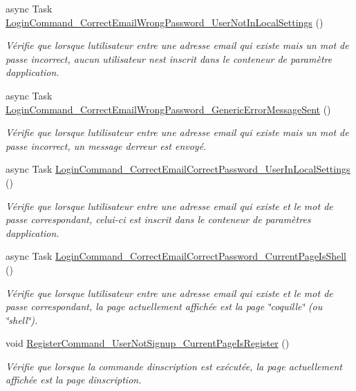 \begin{DoxyCompactItemize}
async Task \hyperlink{class_boxes_1_1_tests_1_1_login_view_model_tests_a2fb23554feb022458a5018736f4ce647}{Login\+Command\+\_\+\+Correct\+Email\+Wrong\+Password\+\_\+\+User\+Not\+In\+Local\+Settings} ()
\begin{DoxyCompactList}\small\item\em Vérifie que lorsque l\textquotesingle{}utilisateur entre une adresse email qui existe mais un mot de passe incorrect, aucun utilisateur n\textquotesingle{}est inscrit dans le conteneur de paramètre d\textquotesingle{}application. \end{DoxyCompactList}\item 
async Task \hyperlink{class_boxes_1_1_tests_1_1_login_view_model_tests_a2a1127de3f6d7a127c1e8988a6b9cd9d}{Login\+Command\+\_\+\+Correct\+Email\+Wrong\+Password\+\_\+\+Generic\+Error\+Message\+Sent} ()
\begin{DoxyCompactList}\small\item\em Vérifie que lorsque l\textquotesingle{}utilisateur entre une adresse email qui existe mais un mot de passe incorrect, un message d\textquotesingle{}erreur est envoyé. \end{DoxyCompactList}\item 
async Task \hyperlink{class_boxes_1_1_tests_1_1_login_view_model_tests_ad0a8d68e805d64ee8a8f35ccd071f9e3}{Login\+Command\+\_\+\+Correct\+Email\+Correct\+Password\+\_\+\+User\+In\+Local\+Settings} ()
\begin{DoxyCompactList}\small\item\em Vérifie que lorsque l\textquotesingle{}utilisateur entre une adresse email qui existe et le mot de passe correspondant, celui-\/ci est inscrit dans le conteneur de paramètres d\textquotesingle{}application. \end{DoxyCompactList}\item 
async Task \hyperlink{class_boxes_1_1_tests_1_1_login_view_model_tests_ac6bd2bd039243bef7c8359b762c476d1}{Login\+Command\+\_\+\+Correct\+Email\+Correct\+Password\+\_\+\+Current\+Page\+Is\+Shell} ()
\begin{DoxyCompactList}\small\item\em Vérifie que lorsque l\textquotesingle{}utilisateur entre une adresse email qui existe et le mot de passe correspondant, la page actuellement affichée est la page \char`\"{}coquille\char`\"{} (ou \char`\"{}shell\char`\"{}). \end{DoxyCompactList}\item 
void \hyperlink{class_boxes_1_1_tests_1_1_login_view_model_tests_abb21a707a97a434e1614425584867e05}{Register\+Command\+\_\+\+User\+Not\+Signup\+\_\+\+Current\+Page\+Is\+Register} ()
\begin{DoxyCompactList}\small\item\em Vérifie que lorsque la commande d\textquotesingle{}inscription est exécutée, la page actuellement affichée est la page d\textquotesingle{}inscription. \end{DoxyCompactList}\end{DoxyCompactItemize}
